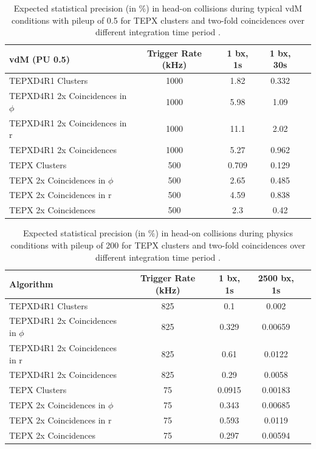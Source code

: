 \begin{table}[htbp]
  \centering
  \caption[Expected stat. precision of TEPX under low pileup] {Expected statistical precision (in $\%$) in head-on collisions during typical vdM conditions with pileup of 0.5 for TEPX clusters and two-fold coincidences over different integration time period \cite{Collaboration:275907420}.}
\begin{tabular}{lcccc}
vdM (PU 0.5) & Trigger Rate (kHz) & 1 bx, 1s & 1 bx, 30s\\
\hline
TEPXD4R1 Clusters&1000&1.82&0.332\\
TEPXD4R1 2x Coincidences in $\phi$ &1000&5.98&1.09\\
TEPXD4R1 2x Coincidences in r &1000&11.1&2.02\\
TEPXD4R1 2x Coincidences &1000&5.27&0.962\\
TEPX Clusters&500&0.709&0.129\\
TEPX 2x Coincidences in $\phi$ &500&2.65&0.485\\
TEPX 2x Coincidences in r &500&4.59&0.838\\
TEPX 2x Coincidences &500&2.3&0.42\\
\end{tabular}
\end{table}


\begin{table}[htbp]
\centering
\caption[Expected stat. precision of TEPX under high pileup]{Expected statistical precision (in $\%$) in head-on collisions during physics conditions with pileup of 200 for TEPX clusters and two-fold coincidences over different integration time period \cite{Collaboration:275907420}.}
\begin{small} %
\begin{tabular}{lcccc}
Algorithm & Trigger Rate (kHz) & 1 bx, 1s & 2500 bx, 1s\\
\hline
TEPXD4R1 Clusters & 825 & 0.1 & 0.002  \\
TEPXD4R1 2x Coincidences in $\phi$ & 825 & 0.329 & 0.00659 \\
TEPXD4R1 2x Coincidences in r & 825 & 0.61 & 0.0122  \\
TEPXD4R1 2x Coincidences & 825 & 0.29 & 0.0058  \\
TEPX Clusters & 75 & 0.0915 & 0.00183  \\
TEPX 2x Coincidences in $\phi$ & 75 & 0.343 & 0.00685 \\
TEPX 2x Coincidences in r & 75 & 0.593 & 0.0119  \\
TEPX 2x Coincidences & 75 & 0.297 & 0.00594  \\
\end{tabular}
\end{small}
\end{table}


